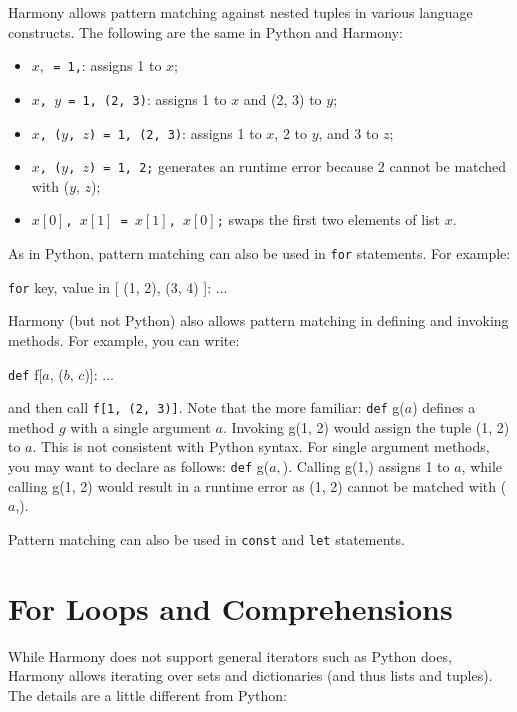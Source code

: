 \documentclass{report}
\newenvironment{code}{
\tcolorbox
}{
\endtcolorbox
}
\begin{document}
Harmony allows pattern matching against nested tuples in various
language constructs.
%
The following are the same in Python and Harmony:
\begin{itemize}
\item \texttt{$x,$ = 1,}: assigns 1 to $x$;
\item \texttt{$x$, $y$ = 1, (2, 3)}: assigns 1 to $x$ and (2, 3) to $y$;
\item \texttt{$x$, ($y$, $z$) = 1, (2, 3)}: assigns 1 to $x$, 2 to $y$, and
3 to $z$;
\item \texttt{$x$, ($y$, $z$) = 1, 2;} generates an runtime error because 2 cannot
be matched with ($y$, $z$);
\item \texttt{$x[0]$, $x[1]$ = $x[1]$, $x[0]$;} swaps the first two elements of list $x$.
\end{itemize}

As in Python, pattern matching can also be used in \texttt{for} statements.
For example:
\begin{code}
\texttt{for} key, value in [ (1, 2), (3, 4) ]:
    ...
\end{code}

Harmony (but not Python)
also allows pattern matching in defining and invoking methods.
For example, you can write:
\begin{code}
\texttt{def} f[$a$, ($b$, $c$)]: ...
\end{code}
and then call \texttt{f[1, (2, 3)]}.
Note that the more familiar: \texttt{def} g($a$) defines a method $g$ with
a single argument $a$.  Invoking g(1, 2) would assign the tuple (1, 2) to
$a$.  This is not consistent with Python syntax.  For single argument methods,
you may want to declare as follows: \texttt{def} g($a,$).
Calling g(1,) assigns 1 to $a$, while calling g(1, 2) would result in a
runtime error as (1, 2) cannot be matched with ($a$,).

Pattern matching can also be used in \texttt{const} and \texttt{let}
statements.

\section{For Loops and Comprehensions}

While Harmony does not support general iterators such as Python does,
Harmony allows iterating over sets and dictionaries (and thus lists
and tuples).  The details are a little different from Python:
\end{document}
